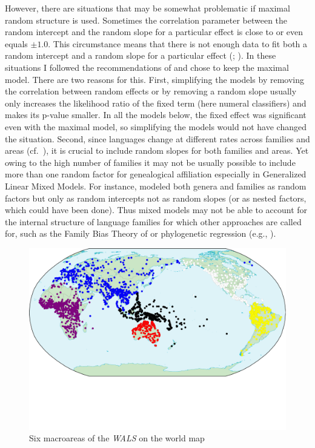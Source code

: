 \documentclass[output=collectionpaper]{langsci/langscibook}
\begin{document}
However, there are situations that may be somewhat problematic if maximal random structure is used. Sometimes the correlation parameter between the random intercept and the random slope for a particular effect is close to or even equals $\pm1.0$. This circumstance means that there is not enough data to fit both a random intercept and a random slope for a particular effect (\citealt{Baayen2008}; \citealt{Bates2015a}). In these situations I followed the recommendations of \citet{Barr2013} and chose to keep the maximal model. There are two reasons for this. First, simplifying the models by removing the correlation between random effects or by removing a random slope usually only increases the likelihood ratio of the fixed term (here numeral classifiers) and makes its p-value smaller. In all the models below, the fixed effect was significant even with the maximal model, so simplifying the models would not have changed the situation. Second, since languages change at different rates across families and areas (cf.\ \citealt{Nichols2003}), it is crucial to include random slopes for both families and areas. Yet owing to the high number of families it may not be usually possible to include more than one random factor for genealogical affiliation especially in Generalized Linear Mixed Models. For instance, \citet{Atkinson2011} modeled both genera and families as random factors but only as random intercepts not as random slopes (or as nested factors, which could have been done). Thus mixed models may not be able to account for the internal structure of language families for which other approaches are called for, such as the Family Bias Theory of \citet{Bickel2013b} or phylogenetic regression (e.g., \citealt{Dunn2011}).

\begin{figure}
\includegraphics[width=\textwidth]{figures/13/Fig7_Map6areas_s}
\caption{Six macroareas of the \textit{WALS} on the world map}
\label{fig:Sinne:7}
\end{figure}
\end{document}
